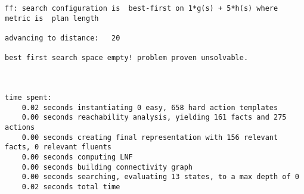 \documentclass{article}
\begin{document}
\begin{lstlisting}[language=none]
ff: search configuration is  best-first on 1*g(s) + 5*h(s) where metric is  plan length

advancing to distance:   20

best first search space empty! problem proven unsolvable.



time spent:
    0.02 seconds instantiating 0 easy, 658 hard action templates
    0.00 seconds reachability analysis, yielding 161 facts and 275 actions
    0.00 seconds creating final representation with 156 relevant facts, 0 relevant fluents
    0.00 seconds computing LNF
    0.00 seconds building connectivity graph
    0.00 seconds searching, evaluating 13 states, to a max depth of 0
    0.02 seconds total time
\end{lstlisting}
\end{document}
